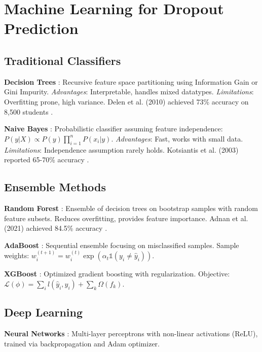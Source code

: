 \section{Machine Learning for Dropout Prediction}

\subsection{Traditional Classifiers}

\textbf{Decision Trees} \cite{quinlan1986induction}: Recursive feature space partitioning using Information Gain or Gini Impurity. \textit{Advantages}: Interpretable, handles mixed datatypes. \textit{Limitations}: Overfitting prone, high variance. Delen et al. (2010) achieved 73\% accuracy on 8,500 students \cite{delen2010comparative}.

\textbf{Naive Bayes} \cite{rish2001empirical}: Probabilistic classifier assuming feature independence: $P(y|X) \propto P(y) \prod_{i=1}^{n} P(x_i|y)$. \textit{Advantages}: Fast, works with small data. \textit{Limitations}: Independence assumption rarely holds. Kotsiantis et al. (2003) reported 65-70\% accuracy \cite{kotsiantis2003machine}.

\subsection{Ensemble Methods}

\textbf{Random Forest} \cite{breiman2001random}: Ensemble of decision trees on bootstrap samples with random feature subsets. Reduces overfitting, provides feature importance. Adnan et al. (2021) achieved 84.5\% accuracy \cite{adnan2021student}.

\textbf{AdaBoost} \cite{freund1997decision}: Sequential ensemble focusing on misclassified samples. Sample weights: $w_i^{(t+1)} = w_i^{(t)} \exp(\alpha_t \mathbb{1}(y_i \neq \hat{y}_i))$.

\textbf{XGBoost} \cite{chen2016xgboost}: Optimized gradient boosting with regularization. Objective: $\mathcal{L}(\phi) = \sum_i l(\hat{y}_i, y_i) + \sum_k \Omega(f_k)$.

\subsection{Deep Learning}

\textbf{Neural Networks} \cite{goodfellow2016deep}: Multi-layer perceptrons with non-linear activations (ReLU), trained via backpropagation and Adam optimizer.

